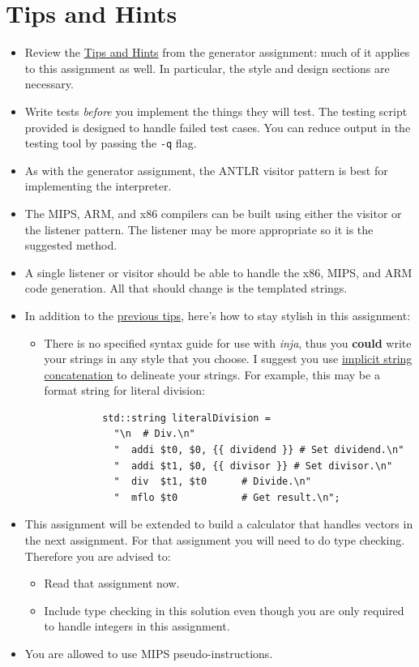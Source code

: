 \documentclass{article}
\newcommand{\code}[1]{\texttt{\textmd{#1}}}
\begin{document}
\section{Tips and Hints}
\begin{itemize}
  \item
    Review the \href{https://webdocs.cs.ualberta.ca/\%7Ec415/generator/}{Tips and Hints} from the
    generator assignment: much of it applies to this assignment as well. In particular, the
    style and design sections are necessary.
  \item
    Write tests \textit{before} you implement the things they will test. The testing script
    provided is designed to handle failed test cases. You can reduce output in the testing tool by
    passing the \code{-q} flag.
  \item
    As with the generator assignment, the ANTLR visitor pattern is best for implementing the
    interpreter.
  \item
    The MIPS, ARM, and x86 compilers can be built using either the visitor or the listener pattern.
    The listener may be more appropriate so it is the suggested method.
  \item
    A single listener or visitor should be able to handle the x86, MIPS, and ARM code generation.
    All that should change is the templated strings.
  \item
    In addition to the \href{https://webdocs.cs.ualberta.ca/\%7Ec415/generator/}{previous tips},
    here's how to stay stylish in this assignment:
    \begin{itemize}
      \item
        There is no specified syntax guide for use with \textit{inja}, thus you \textbf{could}
        write your strings in any style that you choose. I suggest you use
        \href{https://softwareengineering.stackexchange.com/q/254984}{implicit string
        concatenation} to delineate your strings. For example, this may be a format string for
        literal division:
        \begin{lstlisting}
          std::string literalDivision =
            "\n  # Div.\n"
            "  addi $t0, $0, {{ dividend }} # Set dividend.\n"
            "  addi $t1, $0, {{ divisor }} # Set divisor.\n"
            "  div  $t1, $t0      # Divide.\n"
            "  mflo $t0           # Get result.\n";
        \end{lstlisting}
    \end{itemize}
  \item
    This assignment will be extended to build a calculator that handles vectors in the next
    assignment. For that assignment you will need to do type checking. Therefore you are advised
    to:
  \begin {itemize}
    \item
      Read that assignment now.
    \item
      Include type checking in this solution even though you are only required to handle integers
      in this assignment.
  \end {itemize}
  \item
    You are allowed to use MIPS pseudo-instructions.

\end{itemize}
\end{document}
